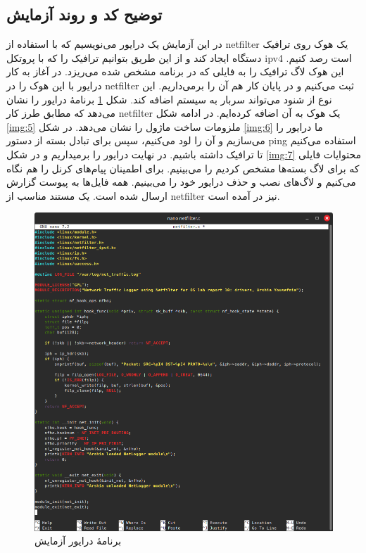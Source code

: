 \documentclass[12pt]{article}
\begin{document}
	\subsection{توضیح کد و روند آزمایش}
	در این آزمایش یک درایور می‌نویسیم که با استفاده از \textenglish{netfilter} یک هوک روی ترافیک دستگاه ایجاد کند و از این طریق بتوانیم ترافیک را که با پروتکل \textenglish{ipv4} است رصد کنیم. این هوک لاگ ترافیک را به فایلی که در برنامه مشخص شده می‌ریزد. در آغاز به کار درایور با این هوک را در \textenglish{netfilter} ثبت می‌کنیم و در پایان کار هم آن را برمی‌داریم. این نوع از شنود می‌تواند سربار به سیستم اضافه کند. شکل \ref{img:4} برنامهٔ درایور را نشان می‌دهد که مطابق طرز کار \textenglish{netfilter} یک هوک به آن اضافه کرده‌ایم. در ادامه شکل \ref{img:5} ملزومات ساخت ماژول را نشان می‌دهد. در شکل \ref{img:6} ما درایور را می‌سازیم و آن را لود می‌کنیم، سپس برای تبادل بسته از دستور \textenglish{ping} استفاده می‌کنیم تا ترافیک داشته باشیم. در نهایت درایور را برمیداریم و در شکل \ref{img:7} محتوایات فایلی که برای لاگ بسته‌ها مشخص کردیم را می‌بینیم. برای اطمینان پیام‌های کرنل را هم نگاه می‌کنیم و لاگ‌های نصب و حذف درایور خود را می‌بینیم. همه فایل‌ها به پیوست گزارش ارسال شده است. یک مستند مناسب از \textenglish{netfilter} نیز در \cite{a1} آمده است.
	\begin{figure}[H]
		\centering
		\includegraphics[width=\textwidth]{report10-resources/screenshots/4.png}
		\caption{برنامهٔ درایور آزمایش}
		\label{img:4}
	\end{figure}
\end{document}
